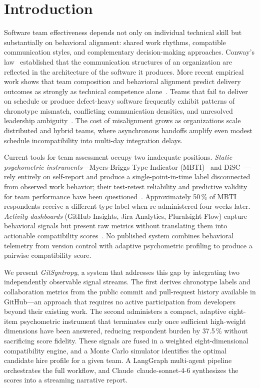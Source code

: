 \documentclass[conference]{IEEEtran}
\begin{document}
\section{Introduction}

Software team effectiveness depends not only on individual technical
skill but substantially on behavioral alignment: shared work rhythms,
compatible communication styles, and complementary decision-making
approaches.  Conway's law~\cite{herbsleb1999} established that the
communication structures of an organization are reflected in the
architecture of the software it produces.  More recent empirical
work shows that team composition and behavioral alignment predict
delivery outcomes as strongly as technical competence
alone~\cite{tamburri2019}.  Teams that fail to deliver on schedule
or produce defect-heavy software frequently exhibit patterns of
chronotype mismatch, conflicting communication densities, and
unresolved leadership ambiguity~\cite{catolino2019}.  The cost of
misalignment grows as organizations scale distributed and hybrid
teams, where asynchronous handoffs amplify even modest schedule
incompatibility into multi-day integration delays.

Current tools for team assessment occupy two inadequate positions.
\textit{Static psychometric instruments}---Myers-Briggs Type
Indicator (MBTI)~\cite{myers1943} and DiSC~\cite{marston1928}---rely
entirely on self-report and produce a single-point-in-time label
disconnected from observed work behavior; their test-retest
reliability and predictive validity for team performance have been
questioned~\cite{pittenger1993, halfhill2005}.  Approximately
50\,\% of MBTI respondents receive a different type label when
re-administered four weeks later.  \textit{Activity dashboards}
(GitHub Insights, Jira Analytics, Pluralsight Flow) capture
behavioral signals but present raw metrics without translating them
into actionable compatibility scores~\cite{dingsoyr2012}.  No
published system combines behavioral telemetry from version control
with adaptive psychometric profiling to produce a pairwise
compatibility score.

We present \textit{GitSyntropy}, a system that addresses this gap
by integrating two independently observable signal streams.  The
first derives chronotype labels and collaboration metrics from the
public commit and pull-request history available in GitHub---an
approach that requires no active participation from developers
beyond their existing work.  The second administers a compact,
adaptive eight-item psychometric instrument that terminates early
once sufficient high-weight dimensions have been answered, reducing
respondent burden by 37.5\,\% without sacrificing score fidelity.
These signals are fused in a weighted eight-dimensional compatibility
engine, and a Monte Carlo simulator identifies the optimal candidate
hire profile for a given team.  A LangGraph multi-agent pipeline
orchestrates the full workflow, and Claude~claude-sonnet-4-6 synthesizes
the scores into a streaming narrative report.
\end{document}
